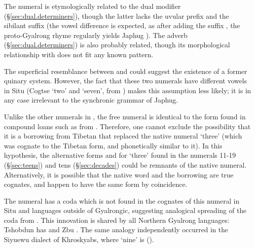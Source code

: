 The numeral  is etymologically related to the dual modifier  (§\ref{sec:dual.determiners}), though the latter lacks the uvular prefix and the sibilant suffix (the vowel difference is expected, as after adding the suffix , the proto-Gyalrong rhyme  regularly yields Japhug ). The adverb  (§\ref{sec:dual.determiners}) is also probably related, though its morphological relationship with  does not fit any known pattern.

The superficial resemblance between  and  could suggest the existence of a former quinary system. However, the fact that these two numerals have different vowels in Situ (Cogtse  `two' and  `seven', from \citealt{huangsun02}) makes this assumption less likely; it is in any case irrelevant to the synchronic grammar of Japhug.

Unlike the other numerals in ,  the free numeral  is identical to the form found in compound loans such as   from . Therefore, one cannot exclude the possibility that it is a borrowing from Tibetan  that replaced the native numeral `three' (which was cognate to the Tibetan form, and phonetically similar to it). In this hypothesis, the alternative forms  and  for `three' found in the numerals 11-19 (§\ref{sec:teens}) and tens  (§\ref{sec:decades}) could be remnants of the native numeral. Alternatively, it is possible that the native word and the borrowing are true cognates, and happen to have the same form by coincidence.

The numeral  has a coda  which is not found in the cognates of this numeral in Situ and languages outside of Gyalrongic, suggesting analogical spreading of the coda from .
This innovation is shared by all Northern Gyalrong languages: Tshobdun has  \citep{jackson19tshobdun} and Zbu  \citep[130]{gong18these}. The same analogy independently occurred in the Siyuewu dialect of Khroskyabs, where  `nine' is  (\citealt[174]{lai17khroskyabs}).

